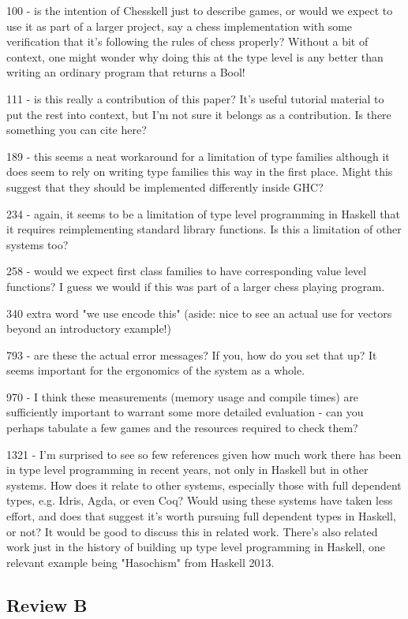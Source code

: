 100 - is the intention of Chesskell just to describe games, or would we expect to use it as part of a larger project, say a chess implementation with some verification that it's following the rules of chess properly? Without a bit of context, one might wonder why doing this at the type level is any better than writing an ordinary program that returns a Bool!

111 - is this really a contribution of this paper? It's useful tutorial material to put the rest into context, but I'm not sure it belongs as a contribution. Is there something you can cite here?

189 - this seems a neat workaround for a limitation of type families although it does seem to rely on writing type families this way in the first place. Might this suggest that they should be implemented differently inside GHC?

234 - again, it seems to be a limitation of type level programming in Haskell that it requires reimplementing standard library functions. Is this a limitation of other systems too?

258 - would we expect first class families to have corresponding value level functions? I guess we would if this was part of a larger chess playing program.

340 extra word "we use encode this" (aside: nice to see an actual use for vectors beyond an introductory example!)

793 - are these the actual error messages? If you, how do you set that up? It seems important for the ergonomics of the system as a whole.

970 - I think these measurements (memory usage and compile times) are sufficiently important to warrant some more detailed evaluation - can you perhaps tabulate a few games and the resources required to check them?

1321 - I'm surprised to see so few references given how much work there has been in type level programming in recent years, not only in Haskell but in other systems. How does it relate to other systems, especially those with full dependent types, e.g. Idris, Agda, or even Coq? Would using these systems have taken less effort, and does that suggest it's worth pursuing full dependent types in Haskell, or not? It would be good to discuss this in related work. There's also related work just in the history of building up type level programming in Haskell, one relevant example being "Hasochism" from Haskell 2013.

\subsection*{Review B}

